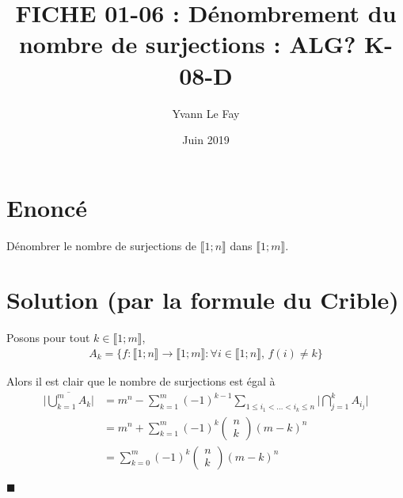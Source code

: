 \documentclass{article}
\newcommand*{\QED}{\hfill\ensuremath{\blacksquare}}%
\begin{document}
\title{FICHE 01-06 : Dénombrement du nombre de surjections : ALG? K-08-D}
\author{Yvann Le Fay}
\date{Juin 2019}
\maketitle
\section*{Enoncé}
Dénombrer le nombre de surjections de $\llbracket 1;n\rrbracket$ dans $\llbracket 1;m\rrbracket$.
\section*{Solution (par la formule du Crible)}
Posons pour tout $k\in\llbracket 1;m\rrbracket$,
\begin{align*}
A_k = \{f : \llbracket 1;n\rrbracket \to \llbracket 1;m\rrbracket : \forall i\in\llbracket 1;n\rrbracket, \, f(i) \neq k\}
\end{align*}

Alors il est clair que le nombre de surjections est égal à 
\begin{align*}
\bigg|\overline{\bigcup_{k=1}^m A_k}\bigg| & = m^n - \sum_{k=1}^m (-1)^{k-1}\sum_{1\leq i_1<\ldots<i_k\leq n}\bigg|\bigcap_{j=1}^kA_{i_j}\bigg|\\
&=m^n +\sum_{k=1}^m (-1)^k \begin{pmatrix}
n\\k
\end{pmatrix} (m-k)^n\\
&=\sum_{k=0}^m (-1)^k \begin{pmatrix}
n\\k
\end{pmatrix}
(m-k)^n 
\end{align*}


\QED
\end{document}
